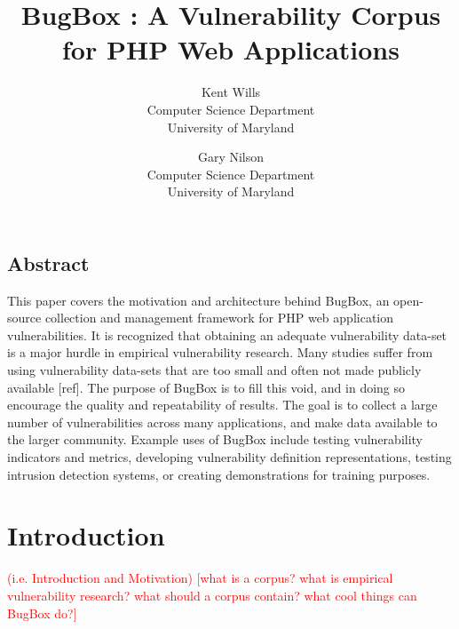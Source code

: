 \documentclass[letterpaper,twocolumn,10pt]{article}
\begin{document}
\date{}


\title{\Large \bf BugBox : A Vulnerability Corpus for PHP Web Applications}


\author{
{\rm Kent Wills}\\
Computer Science Department\\University of Maryland
\and
{\rm Gary Nilson}\\
Computer Science Department\\University of Maryland
} %

\maketitle

\thispagestyle{empty}

\subsection*{Abstract}

This paper covers the motivation and architecture behind BugBox, an open-source collection and management framework for PHP web application vulnerabilities. It is recognized that obtaining an adequate vulnerability data-set is a major hurdle in empirical vulnerability research. Many studies suffer from using vulnerability data-sets that are too small and often not made publicly available [ref]. The purpose of BugBox is to fill this void, and in doing so encourage the quality and repeatability of results. The goal is to collect a large number of vulnerabilities across many applications, and make data available to the larger community. Example uses of BugBox include testing vulnerability indicators and metrics, developing vulnerability definition representations, testing intrusion detection systems, or creating demonstrations for training purposes. 

\section{Introduction}
\textcolor{red}{
(i.e. Introduction and Motivation)
[what is a corpus?
 what is empirical vulnerability research?
 what should a corpus contain?
 what cool things can BugBox do?]}
\end{document}
